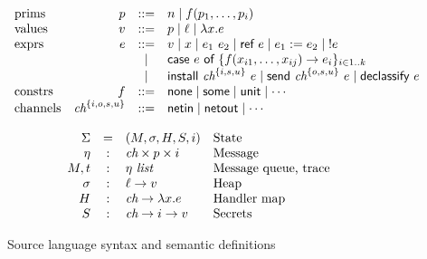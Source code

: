 \documentclass[conference]{IEEEtran}
\theoremstyle{definition}
\newcommand{\aset}[1]{\{#1\}}
\newcommand{\sfmt}[1]{\textsf{#1}}
\newcommand{\sch}{\textit{ch}}
\newcommand{\loc}{\ell}
\newcommand{\sassign}[2]{#1 := #2}
\newcommand{\scase}[2]{\sfmt{case}~#1~\sfmt{of}~#2}
\newcommand{\sderef}[1]{!#1}
\newcommand{\sinstall}[2]{\sfmt{install}~#1~#2}
\newcommand{\sdeclassify}[1]{\sfmt{declassify}~#1}
\newcommand{\sref}[1]{\sfmt{ref}~#1}
\newcommand{\ssend}[2]{\sfmt{send}~#1~#2}
\newcommand{\sunit}{\sfmt{unit}}
\newcommand{\xv}{p}
\newcommand{\typ}{\tau}
\newcommand{\tint}{\textit{int}}
\newcommand{\evt}{\eta}
\begin{document}
\begin{figure}[t]
  \begin{displaymath}
    \begin{array}{lrcl}
      \hbox{prims} & \xv & ::= & n \mid f(\xv_1, \ldots, \xv_i)  \\
      \hbox{values} & v & ::= & \xv \mid \loc \mid \lambda x.e \\
      \hbox{exprs} & e & ::= &
      v
      \mid x
      \mid e_1~e_2
      \mid \sref{e}
      \mid \sassign{e_1}{e_2}
      \mid \;\sderef{e} \\
      && \mid & \scase{e}{\aset{f(x_{i1}, \ldots, x_{ij}) \rightarrow
          e_i}_{i\in 1..k}} \\
      && \mid & \sinstall{\sch^{\{i,s,u\}}}{e}
      \mid \ssend{\sch^{\{o,s,u\}}}{e}
      \mid \sdeclassify{e} \\
      \hbox{constrs} & f & ::= &
      \sfmt{none} \mid \sfmt{some} \mid \sunit \mid \cdots \\
      \hbox{channels} & \sch^{\{i,o,s,u\}} & ::= & \sfmt{netin} \mid \sfmt{netout}
      \mid \cdots \\
    \end{array}
  \end{displaymath}    

    
  \begin{displaymath}
    \begin{array}{rcll}
      \Sigma & = & (M, \sigma, H, S, i) & \hbox{State} \\
      \evt & : & \sch \times p \times i  & \hbox{Message} \\
      M, t & : & \evt ~ \textit{list} & \hbox{Message queue, trace}\\
      \sigma & : & \loc \rightarrow v & \hbox{Heap} \\
      H & : & \sch \rightarrow \lambda x.e & \hbox{Handler map} \\
      S & : & \sch \rightarrow i \rightarrow v & \hbox{Secrets}
    \end{array}
  \end{displaymath}
  \caption{Source language syntax and semantic definitions}
  \label{fig:lang}
\end{figure}
\end{document}
